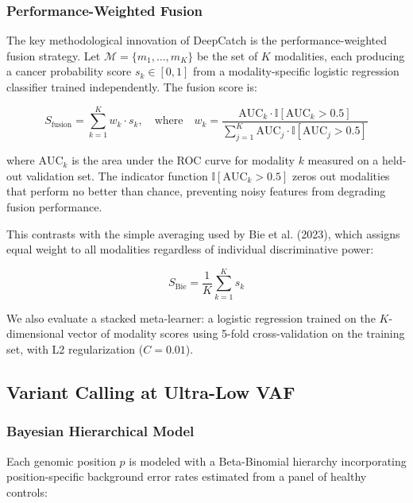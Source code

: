 \documentclass[10pt,a4paper]{article}
\begin{document}
\subsubsection{Performance-Weighted Fusion}

The key methodological innovation of DeepCatch is the performance-weighted fusion strategy. Let $\mathcal{M} = \{m_1, \ldots, m_K\}$ be the set of $K$ modalities, each producing a cancer probability score $s_k \in [0,1]$ from a modality-specific logistic regression classifier trained independently. The fusion score is:

\begin{equation}
S_{\text{fusion}} = \sum_{k=1}^{K} w_k \cdot s_k, \quad \text{where} \quad w_k = \frac{\text{AUC}_k \cdot \mathbb{I}[\text{AUC}_k > 0.5]}{\sum_{j=1}^{K} \text{AUC}_j \cdot \mathbb{I}[\text{AUC}_j > 0.5]}
\label{eq:perf_weight}
\end{equation}

where $\text{AUC}_k$ is the area under the ROC curve for modality $k$ measured on a held-out validation set. The indicator function $\mathbb{I}[\text{AUC}_k > 0.5]$ zeros out modalities that perform no better than chance, preventing noisy features from degrading fusion performance.

This contrasts with the simple averaging used by Bie et al. (2023), which assigns equal weight to all modalities regardless of individual discriminative power:

\begin{equation}
S_{\text{Bie}} = \frac{1}{K} \sum_{k=1}^{K} s_k
\label{eq:simple_avg}
\end{equation}

We also evaluate a stacked meta-learner: a logistic regression trained on the $K$-dimensional vector of modality scores using 5-fold cross-validation on the training set, with L2 regularization ($C=0.01$).

\subsection{Variant Calling at Ultra-Low VAF}

\subsubsection{Bayesian Hierarchical Model}

Each genomic position $p$ is modeled with a Beta-Binomial hierarchy incorporating position-specific background error rates estimated from a panel of healthy controls:
\end{document}
